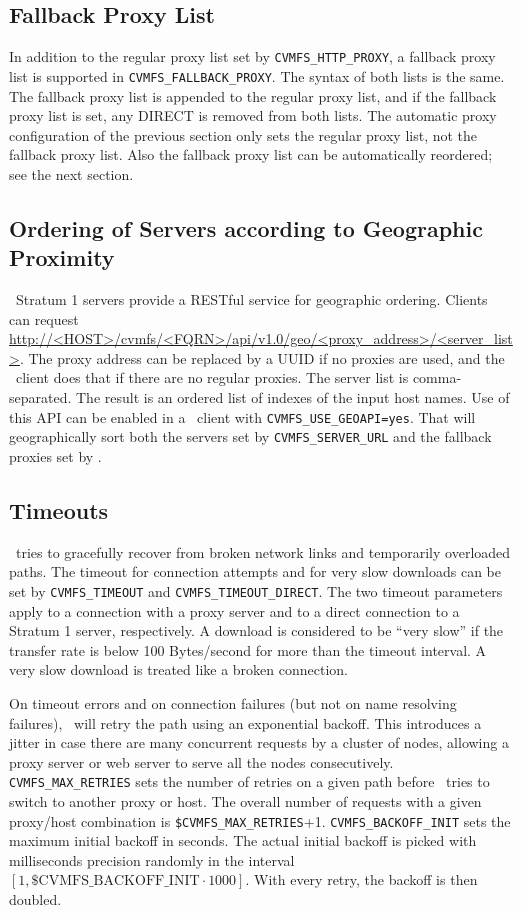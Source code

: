 \subsection{Fallback Proxy List}
In addition to the regular proxy list set by \texttt{CVMFS\_HTTP\_PROXY},
a fallback proxy list is supported in \texttt{CVMFS\_FALLBACK\_PROXY}.
The syntax of both lists is the same.  The fallback proxy list is
appended to the regular proxy list, and if the fallback proxy list
is set, any DIRECT is removed from both lists.  The automatic proxy
configuration of the previous section only sets the regular proxy list,
not the fallback proxy list.  Also the fallback proxy list can be
automatically reordered; see the next section.

\subsection{Ordering of Servers according to Geographic Proximity}
\label{sct:geoapi}
\cvmfs\ Stratum 1 servers provide a RESTful service for geographic
ordering.  Clients can request 
\url{http://<HOST>/cvmfs/<FQRN>/api/v1.0/geo/<proxy_address>/<server_list>}.
The proxy address can be replaced by a UUID if no proxies are used,
and the \cvmfs\ client does that if there are no regular proxies.
The server list is comma-separated.  The result is an ordered list
of indexes of the input host names.  Use of this API can be enabled
in a \cvmfs\ client with \texttt{CVMFS\_USE\_GEOAPI=yes}.  That will
geographically sort both the servers set by \texttt{CVMFS\_SERVER\_URL}
and the fallback proxies set by .

\subsection{Timeouts}
\cvmfs\ tries to gracefully recover from broken network links and temporarily overloaded paths.
The timeout for connection attempts and for very slow downloads can be set by \texttt{CVMFS\_TIMEOUT} and \texttt{CVMFS\_TIMEOUT\_DIRECT}.
The two timeout parameters apply to a connection with a proxy server and to a direct connection to a Stratum 1 server, respectively.
A download is considered to be ``very slow'' if the transfer rate is below 100 Bytes/second for more than the timeout interval.
A very slow download is treated like a broken connection.

On timeout errors and on connection failures (but not on name resolving failures), \cvmfs\ will retry the path using an exponential backoff.
This introduces a jitter in case there are many concurrent requests by a cluster of nodes, allowing a proxy server or web server to serve all the nodes consecutively.
\texttt{CVMFS\_MAX\_RETRIES} sets the number of retries on a given path before \cvmfs\ tries to switch to another proxy or host. 
The overall number of requests with a given proxy/host combination is \texttt{\$CVMFS\_MAX\_RETRIES}+1.
\texttt{CVMFS\_BACKOFF\_INIT} sets the maximum initial backoff in seconds.  
The actual initial backoff is picked with milliseconds precision randomly in the interval $[1, \text{\$CVMFS\_BACKOFF\_INIT}\cdot 1000]$.
With every retry, the backoff is then doubled.

